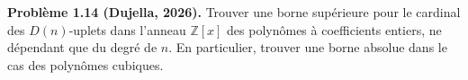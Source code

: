 \textbf{Problème 1.14 (Dujella, 2026).} Trouver une borne supérieure pour le cardinal des $D(n)$-uplets dans l'anneau $\mathbb{Z}[x]$ des polynômes à coefficients entiers, ne dépendant que du degré de $n$. En particulier, trouver une borne absolue dans le cas des polynômes cubiques.
